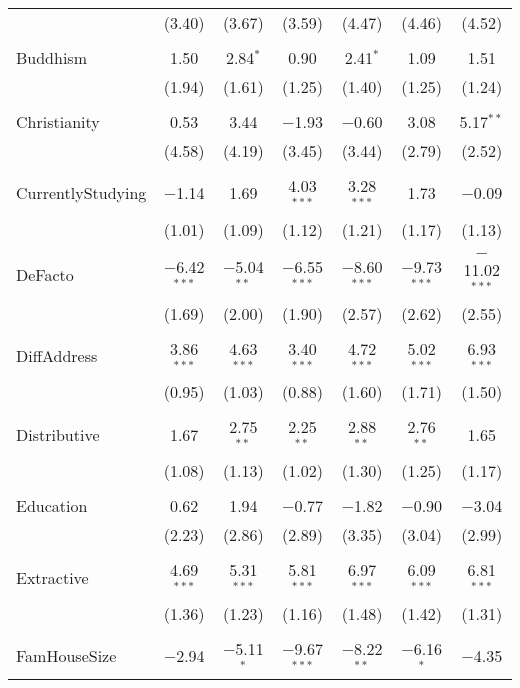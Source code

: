 \documentclass[openany]{book}
\begin{document}
\begin{table}[!htbp]
\begin{tabular}{@{\extracolsep{1pt}}lcccccc}
  & (3.40) & (3.67) & (3.59) & (4.47) & (4.46) & (4.52) \\ 
  & & & & & & \\ 
 Buddhism & 1.50 & 2.84$^{*}$ & 0.90 & 2.41$^{*}$ & 1.09 & 1.51 \\ 
  & (1.94) & (1.61) & (1.25) & (1.40) & (1.25) & (1.24) \\ 
  & & & & & & \\ 
 Christianity & 0.53 & 3.44 & $-$1.93 & $-$0.60 & 3.08 & 5.17$^{**}$ \\ 
  & (4.58) & (4.19) & (3.45) & (3.44) & (2.79) & (2.52) \\ 
  & & & & & & \\ 
 CurrentlyStudying & $-$1.14 & 1.69 & 4.03$^{***}$ & 3.28$^{***}$ & 1.73 & $-$0.09 \\ 
  & (1.01) & (1.09) & (1.12) & (1.21) & (1.17) & (1.13) \\ 
  & & & & & & \\ 
 DeFacto & $-$6.42$^{***}$ & $-$5.04$^{**}$ & $-$6.55$^{***}$ & $-$8.60$^{***}$ & $-$9.73$^{***}$ & $-$11.02$^{***}$ \\ 
  & (1.69) & (2.00) & (1.90) & (2.57) & (2.62) & (2.55) \\ 
  & & & & & & \\ 
 DiffAddress & 3.86$^{***}$ & 4.63$^{***}$ & 3.40$^{***}$ & 4.72$^{***}$ & 5.02$^{***}$ & 6.93$^{***}$ \\ 
  & (0.95) & (1.03) & (0.88) & (1.60) & (1.71) & (1.50) \\ 
  & & & & & & \\ 
 Distributive & 1.67 & 2.75$^{**}$ & 2.25$^{**}$ & 2.88$^{**}$ & 2.76$^{**}$ & 1.65 \\ 
  & (1.08) & (1.13) & (1.02) & (1.30) & (1.25) & (1.17) \\ 
  & & & & & & \\ 
 Education & 0.62 & 1.94 & $-$0.77 & $-$1.82 & $-$0.90 & $-$3.04 \\ 
  & (2.23) & (2.86) & (2.89) & (3.35) & (3.04) & (2.99) \\ 
  & & & & & & \\ 
 Extractive & 4.69$^{***}$ & 5.31$^{***}$ & 5.81$^{***}$ & 6.97$^{***}$ & 6.09$^{***}$ & 6.81$^{***}$ \\ 
  & (1.36) & (1.23) & (1.16) & (1.48) & (1.42) & (1.31) \\ 
  & & & & & & \\ 
 FamHouseSize & $-$2.94 & $-$5.11$^{*}$ & $-$9.67$^{***}$ & $-$8.22$^{**}$ & $-$6.16$^{*}$ & $-$4.35 \\ 

\end{tabular}
\end{table}
\end{document}
